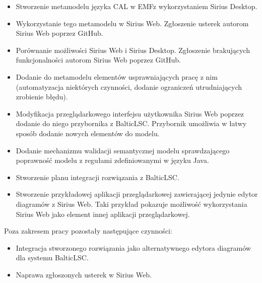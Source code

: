 \begin{itemize}
	\item Stworzenie metamodelu języka \gls{CAL} w \gls{EMF}\@ z wykorzystaniem Sirius Desktop.
	\item Wykorzystanie tego metamodelu w Sirius Web. Zgłoszenie usterek autorom Sirius Web poprzez GitHub.
	\item Porównanie możliwości Sirius Web i Sirius Desktop. Zgłoszenie brakujących funkcjonalności autorom Sirius Web poprzez GitHub.
	\item Dodanie do metamodelu elementów usprawniających pracę z nim (automatyzacja niektórych czynności, dodanie ograniczeń utrudniających zrobienie błędu).
	\item Modyfikacja przeglądarkowego interfejsu użytkownika Sirius Web poprzez dodanie do niego przybornika z BalticLSC\@. Przybornik umożliwia w łatwy sposób dodanie nowych elementów do modelu.
	\item Dodanie mechanizmu walidacji semantycznej modelu sprawdzającego poprawność modelu z regułami zdefiniowanymi w języku Java.
	\item Stworzenie planu integracji rozwiązania z BalticLSC\@.
	\item Stworzenie przykładowej aplikacji przeglądarkowej zawierającej jedynie edytor diagramów z Sirius Web. Taki przykład pokazuje możliwość wykorzystania Sirius Web jako element innej aplikacji przeglądarkowej.
\end{itemize}

\vspace{1em}

\noindent Poza zakresem pracy pozostały następujące czynności:

\begin{itemize}
	\item Integracja stworzonego rozwiązania jako alternatywnego edytora diagramów dla systemu BalticLSC\@.
	\item Naprawa zgłoszonych usterek w Sirius Web.
\end{itemize}
